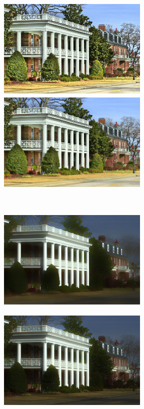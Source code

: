 \begin{figure}[t]
\begin{minipage}[b]{0.49\hsize}
		 \label{fig. decomp_wvm}
	\end{minipage}\\
	\begin{minipage}[b]{0.49\hsize}
	\centering
	\includegraphics[width=72mm, height=48mm]{images/experiment/decomp/jiep/reflectance.eps}
	\end{minipage}
	\begin{minipage}[b]{0.49\hsize}
	\centering
	\includegraphics[width=72mm, height=48mm]{images/experiment/decomp/prop/reflectance.eps}
	\end{minipage}\\
	\vspace{1.5mm}
	\begin{minipage}[b]{0.49\hsize}
	\centering
	\includegraphics[width=72mm, height=48mm]{images/experiment/decomp/jiep/illumination.eps}
	 \label{fig. decomp_jiep}
	\end{minipage}
	\begin{minipage}[b]{0.49\hsize}
	\centering
	\includegraphics[width=72mm, height=48mm]{images/experiment/decomp/prop/illumination.eps}

\end{minipage}
\end{figure}
